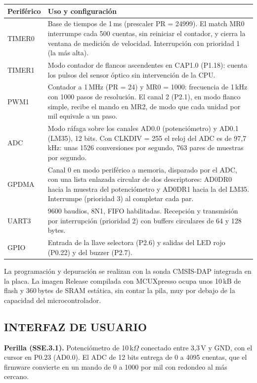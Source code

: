 \begin{longtable}{|p{2.4cm}|p{12.2cm}|}
\hline
\textbf{Periférico} & \textbf{Uso y configuración} \\ \hline
\endhead
TIMER0 & Base de tiempos de 1\,ms (prescaler PR = 24999). El match MR0 interrumpe cada
500 cuentas, sin reiniciar el contador, y cierra la ventana de medición de velocidad.
Interrupción con prioridad 1 (la más alta). \\ \hline
TIMER1 & Modo contador de flancos ascendentes en CAP1.0 (P1.18): cuenta los pulsos del
sensor óptico sin intervención de la CPU. \\ \hline
PWM1 & Contador a 1\,MHz (PR = 24) y MR0 = 1000: frecuencia de 1\,kHz con 1000 pasos de
resolución. El canal 2 (P2.1), en modo flanco simple, recibe el mando en MR2, de modo que
cada unidad por mil equivale a un paso. \\ \hline
ADC & Modo ráfaga sobre los canales AD0.0 (potenciómetro) y AD0.1 (LM35), 12 bits. Con
CLKDIV = 255 el reloj del ADC es de 97,7\,kHz: unas 1526 conversiones por segundo, 763
pares de muestras por segundo. \\ \hline
GPDMA & Canal 0 en modo periférico a memoria, disparado por el ADC, con una lista enlazada
circular de dos descriptores: AD0DR0 hacia la muestra del potenciómetro y AD0DR1 hacia la
del LM35. Interrumpe (prioridad 3) al completar cada par. \\ \hline
UART3 & 9600 baudios, 8N1, FIFO habilitadas. Recepción y transmisión por interrupción
(prioridad 2) con buffers circulares de 64 y 128 bytes. \\ \hline
GPIO & Entrada de la llave selectora (P2.6) y salidas del LED rojo (P0.22) y del buzzer
(P2.7). \\ \hline
\end{longtable}

La programación y depuración se realizan con la sonda CMSIS-DAP integrada en la placa.
La imagen Release compilada con MCUXpresso ocupa unos 10\,kB de flash y 360\,bytes de SRAM
estática, sin contar la pila, muy por debajo de la capacidad del microcontrolador.

\subsection{INTERFAZ DE USUARIO}

\textbf{Perilla (SSE.3.1).} Potenciómetro de 10\,k$\Omega$ conectado entre 3,3\,V y GND,
con el cursor en P0.23 (AD0.0). El ADC de 12 bits entrega de 0 a 4095 cuentas, que el
firmware convierte en un mando de 0 a 1000 por mil con redondeo al más cercano.

